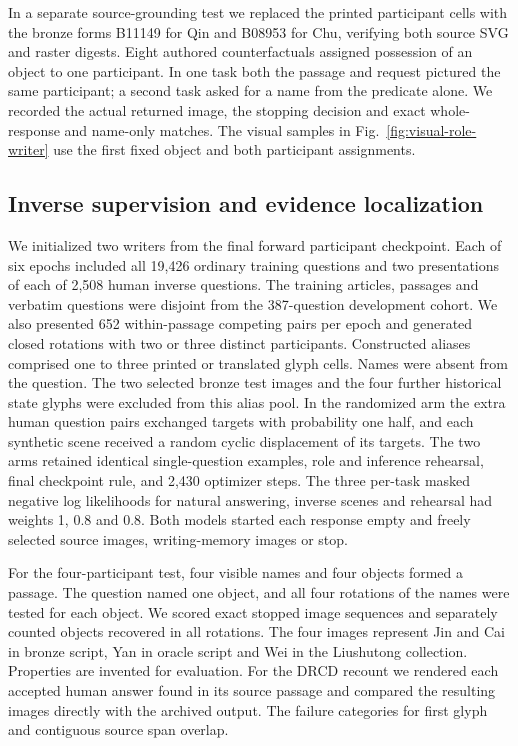 \documentclass[12pt,a4paper]{article}
\providecommand{\DIFadd}[1]{{\protect\color{blue} \sf #1}} %
\begin{document}
\DIFadd{In a separate source-grounding test we replaced the printed participant cells with the bronze forms B11149 for Qin and B08953 for Chu, verifying both source SVG and raster digests. Eight authored counterfactuals assigned possession of an object to one participant. In one task both the passage and request pictured the same participant; a second task asked for a name from the predicate alone. We recorded the actual returned image, the stopping decision and exact whole-response and name-only matches. The visual samples in Fig.~\ref{fig:visual-role-writer} use the first fixed object and both participant assignments.
}

\subsection*{\DIFadd{Inverse supervision and evidence localization}}
\DIFadd{We initialized two writers from the final forward participant checkpoint. Each of six epochs included all 19,426 ordinary training questions and two presentations of each of 2,508 human inverse questions. The training articles, passages and verbatim questions were disjoint from the 387-question development cohort. We also presented 652 within-passage competing pairs per epoch and generated closed rotations with two or three distinct participants. Constructed aliases comprised one to three printed or translated glyph cells. Names were absent from the question. The two selected bronze test images and the four further historical state glyphs were excluded from this alias pool. In the randomized arm the extra human question pairs exchanged targets with probability one half, and each synthetic scene received a random cyclic displacement of its targets. The two arms retained identical single-question examples, role and inference rehearsal, final checkpoint rule, and 2,430 optimizer steps. The three per-task masked negative log likelihoods for natural answering, inverse scenes and rehearsal had weights 1, 0.8 and 0.8. Both models started each response empty and freely selected source images, writing-memory images or stop.
}

\DIFadd{For the four-participant test, four visible names and four objects formed a passage. The question named one object, and all four rotations of the names were tested for each object. We scored exact stopped image sequences and separately counted objects recovered in all rotations. The four images represent Jin and Cai in bronze script, Yan in oracle script and Wei in the Liushutong collection. Properties are invented for evaluation. For the DRCD recount we rendered each accepted human answer found in its source passage and compared the resulting images directly with the archived output. The failure categories for first glyph and contiguous source span overlap.
}
\end{document}
